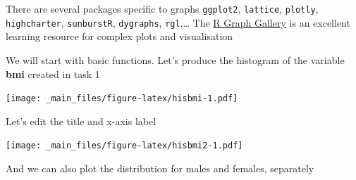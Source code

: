 \documentclass[
]{book}
\newenvironment{Shaded}{\begin{snugshade}}{\end{snugshade}}
\newcommand{\AttributeTok}[1]{\textcolor[rgb]{0.13,0.29,0.53}{#1}}
\newcommand{\FunctionTok}[1]{\textcolor[rgb]{0.13,0.29,0.53}{\textbf{#1}}}
\newcommand{\NormalTok}[1]{#1}
\newcommand{\SpecialCharTok}[1]{\textcolor[rgb]{0.81,0.36,0.00}{\textbf{#1}}}
\newcommand{\StringTok}[1]{\textcolor[rgb]{0.31,0.60,0.02}{#1}}
\begin{document}
There are several packages specific to graphs
\texttt{ggplot2}, \texttt{lattice}, \texttt{plotly}, \texttt{highcharter}, \texttt{sunburstR}, \texttt{dygraphs}, \texttt{rgl},\ldots{}
The \href{https://www.r-graph-gallery.com/index.html}{R Graph Gallery} is an excellent
learning resource for complex plots and visualisation

We will start with basic functions. Let's produce the histogram of the variable
\textbf{bmi} created in task 1

\begin{Shaded}
\end{Shaded}

\texttt{[image: \_main\_files/figure-latex/hisbmi-1.pdf]}

Let's edit the title and x-axis label

\begin{Shaded}
\end{Shaded}

\texttt{[image: \_main\_files/figure-latex/hisbmi2-1.pdf]}

And we can also plot the distribution for males and females, separately
\end{document}
